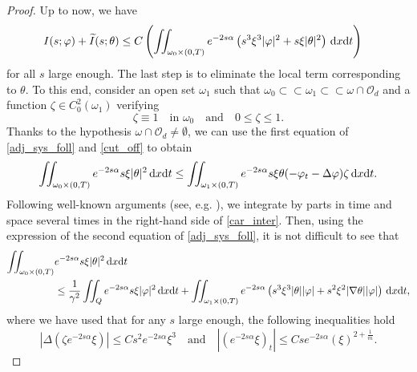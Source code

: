 \documentclass[preprint,10pt]{article}
\numberwithin{equation}{section}
\numberwithin{theorem}{section}
\def\dx{\,\textnormal{d}x}
\def\dt{\textnormal{d}t}
\def\dx{\,\textnormal{d}x}
\def\dt{\textnormal{d}t}
\begin{document}
{\begin{proof}
Up to now, we have 
%
\begin{equation}\label{est_locales}
\begin{split}
I(s;\varphi)+\widetilde{I}(s;\theta)\leq C&\left(\iint_{\omega_0\times(0,T)}e^{-2s\alpha}\left(s^3\xi^3|\varphi|^2+s\xi|\theta|^2\right)\dx\dt \right)
\end{split}
\end{equation}
%
for all $s$ large enough. The last step is to eliminate the local term corresponding to $\theta$. To this end, consider an open set $\omega_1$ such that $\omega_0\subset\subset\omega_1\subset \subset \omega\cap \mathcal O_d$ and a function $\zeta\in C_0^2(\omega_1)$ verifying 
%
\begin{equation}\label{cut_off}
\zeta\equiv 1\quad \text{in } \omega_0 \quad \text{and} \quad 0\leq \zeta\leq 1. 
\end{equation}
%
Thanks to the hypothesis $\omega\cap\mathcal O_d\neq \emptyset$, we can use the first equation of \eqref{adj_sys_foll} and \eqref{cut_off} to obtain
%
\begin{equation}\label{car_inter}
\iint_{\omega_0\times(0,T)}e^{-2s\alpha}s\xi|\theta|^2\dx\dt\leq \iint_{\omega_1\times(0,T)}e^{-2s\alpha}s\xi \theta(-\varphi_t-\Delta \varphi)\zeta\dx\dt.
\end{equation}
%
Following well-known arguments (see, e.g. \cite{luz_manuel,deteresa2000}), we integrate by parts in time and space several times in the right-hand side of \eqref{car_inter}. Then, using the expression of the second equation of \eqref{adj_sys_foll}, it is not difficult to see that 
%
\begin{equation}\label{inter_res}
\begin{split}
\iint_{\omega_0\times(0,T)}&e^{-2s\alpha}s\xi|\theta|^2\dx\dt\\
&\leq \frac{1}{\gamma^2}\iint_{Q}e^{-2s\alpha}s\xi |\varphi|^2\dx\dt+\iint_{\omega_1\times(0,T)}e^{-2s\alpha}\left(s^3\xi^3|\theta| |\varphi|+s^2\xi^2|\nabla \theta||\varphi|\right)\dx\dt,
\end{split}
\end{equation}
%
where we have used that for any $s$ large enough, the following inequalities hold
%
\begin{equation*}
|\Delta(\zeta e^{-2s\alpha}\xi)|\leq Cs^2e^{-2s\alpha}\xi^3 \quad \text{and}\quad |(e^{-2s\alpha}\xi)_t|\leq Cse^{-2s\alpha}(\xi)^{2+\frac{1}{m}}.
\end{equation*}
%


\end{proof}}
\end{document}
